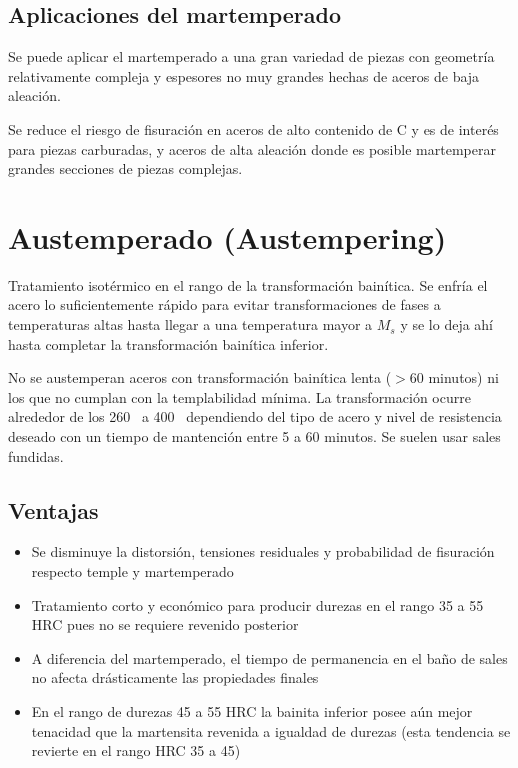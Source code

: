 \subsection{Aplicaciones del martemperado}
Se puede aplicar el martemperado a una gran variedad de piezas con geometría relativamente compleja y espesores no muy grandes hechas de aceros de baja aleación.

Se reduce el riesgo de fisuración en aceros de alto contenido de C y es de interés para piezas carburadas, y aceros de alta aleación donde es posible martemperar grandes secciones de piezas complejas. 



\section[Austemperado]{Austemperado (Austempering)}

Tratamiento isotérmico en el rango de la transformación bainítica. Se enfría el acero lo suficientemente rápido para evitar transformaciones de fases a temperaturas altas hasta llegar a una temperatura mayor a $M_s$ y se lo deja ahí hasta completar la transformación bainítica inferior.

No se austemperan aceros con transformación bainítica lenta ($>60$ minutos) ni los que no cumplan con la templabilidad mínima. La transformación ocurre alrededor de los 260\grad~ a 400\grad~ dependiendo del tipo de acero y nivel de resistencia deseado con un tiempo de mantención entre 5 a 60 minutos. Se suelen usar sales fundidas.

\subsection{Ventajas}
\begin{itemize}
    \item Se disminuye la distorsión, tensiones residuales y probabilidad de fisuración respecto temple y martemperado
    \item Tratamiento corto y económico para producir durezas en el rango 35 a 55 HRC pues no se requiere revenido posterior
    \item A diferencia del martemperado, el tiempo de permanencia en el baño de sales no afecta drásticamente las propiedades finales
    \item En el rango de durezas 45 a 55 HRC la bainita inferior posee aún mejor tenacidad que la martensita revenida a igualdad de durezas (esta tendencia se revierte en el rango HRC 35 a 45)
\end{itemize}

